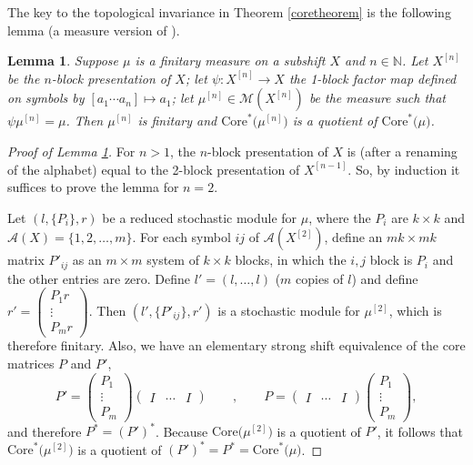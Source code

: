 \documentclass{kepart2010}
\theoremstyle{plain}
\newtheorem{lem}[thm]{Lemma}
\theoremstyle{definition}
\theoremstyle{remark}
\theoremstyle{definition}
\numberwithin{equation}{section}
\begin{document}
The key to the topological invariance in Theorem \ref{coretheorem}
is the following lemma (a measure version of
\cite[Lemma 5.2]{Nasu1985}).

\begin{lem}\label{corelemma}
Suppose $\mu$ is a finitary measure on a subshift $X$ and $n\in
\mathbb N$. Let $X^{[n]}$ be the $n$-block presentation of $X$; let
$\psi : X^{[n]}\to X$ the 1-block factor map defined on symbols by
$[a_1\cdots a_n] \mapsto a_1$; let $\mu^{[n]}\in \mathcal
M(X^{[n]})$ be the measure such that $\psi\mu^{[n]}= \mu$.
 Then
$\mu^{[n]}$ is finitary and $\text{Core}^*\text{(}\mu^{[n]}\text{)}$
is a quotient of $\text{Core}^*\text{(}\mu\text{)}$.
\end{lem}

\begin{proof}[Proof of Lemma \ref{corelemma}]
For $n>1$, the $n$-block presentation of $X$ is (after a
renaming of the alphabet) equal to the 2-block presentation
of $X^{[n-1]}$. So, by induction it suffices to
prove the lemma for $n=2$.

Let $(l, \{P_i\},r)$ be a reduced stochastic
module for $\mu$, where the $P_i$ are $k\times k$
and $\mathcal A(X)=\{1,2,\dots ,m\}$.
For each symbol $ij$ of $\mathcal A(X^{[2]})$, define an
$mk\times mk$ matrix $P'_{ij}$ as an $m\times m$
system of $k\times k$ blocks, in which the
$i,j$ block is $P_i$ and the other entries
are zero. Define $l'=(l,\dots ,l)$
($m$ copies of $l$) and define
$r' =
\begin{pmatrix}
P_1r \\
\vdots \\
P_mr
\end{pmatrix}
$.
Then $(l',\{P'_{ij}\},r')$ is a stochastic module for
$\mu^{[2]}$, which is therefore finitary. Also, we have
an elementary strong shift equivalence of the core
matrices $P$ and $P'$,
\[
P' =
\begin{pmatrix}
P_1 \\
\vdots \\
P_m
\end{pmatrix}
\begin{pmatrix}
I &
\cdots &
I
\end{pmatrix}
\qquad , \qquad
P=
\begin{pmatrix}
I &
\cdots &
I
\end{pmatrix}
\begin{pmatrix}
P_1 \\
\vdots \\
P_m
\end{pmatrix} ,
\]
and therefore $P^*=(P')^*$.
Because
$\text{Core}\text{(}\mu^{[2]}\text{)}$
 is a quotient of $P'$,
it follows that
$\text{Core}^*\text{(}\mu^{[2]}\text{)}$ is  a
quotient of $(P')^*=P^*=
\text{Core}^*\text{(}\mu\text{)}$.
\end{proof}
\end{document}
